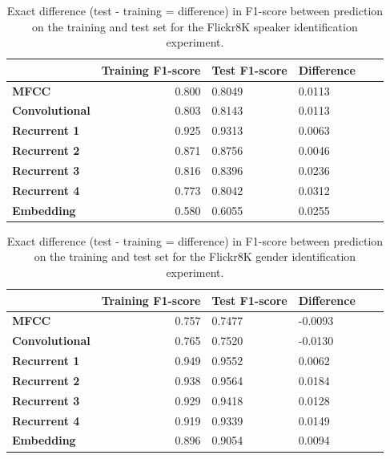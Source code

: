 \documentclass[a4paper, oneside]{book}
\begin{document}
\begin{appendices}
\begin{table}[H]
\begin{center}
\begin{tabular}{|l|r|l|l|l|l|}
\hline              & \bf Training F1-score & \bf Test F1-score & \bf Difference  \\ \hline
\bf MFCC            & 0.800                 & 0.8049            & 0.0113 \\
\bf Convolutional   & 0.803                 & 0.8143            & 0.0113 \\ 
\bf Recurrent 1     & 0.925                 & 0.9313            & 0.0063 \\
\bf Recurrent 2     & 0.871                 & 0.8756            & 0.0046 \\
\bf Recurrent 3     & 0.816                 & 0.8396            & 0.0236 \\
\bf Recurrent 4     & 0.773                 & 0.8042            & 0.0312 \\
\bf Embedding       & 0.580                 & 0.6055            & 0.0255 \\
\hline
\end{tabular}
\end{center}
\caption{\label{table:exact-difference-flickr8k-speaker} Exact difference (test - training = difference) in F1-score between prediction on the training and test set for the Flickr8K speaker identification experiment.  }
\end{table}

\begin{table}[H]
\begin{center}
\begin{tabular}{|l|r|l|l|l|l|}
\hline              & \bf Training F1-score & \bf Test F1-score & \bf Difference  \\ \hline
\bf MFCC            & 0.757                 & 0.7477            & -0.0093 \\
\bf Convolutional   & 0.765                 & 0.7520            & -0.0130 \\ 
\bf Recurrent 1     & 0.949                 & 0.9552            & 0.0062 \\
\bf Recurrent 2     & 0.938                 & 0.9564            & 0.0184 \\
\bf Recurrent 3     & 0.929                 & 0.9418            & 0.0128 \\
\bf Recurrent 4     & 0.919                 & 0.9339            & 0.0149 \\
\bf Embedding       & 0.896                 & 0.9054            & 0.0094 \\
\hline
\end{tabular}
\end{center}
\caption{\label{table:exact-difference-flickr8k-gender} Exact difference (test - training = difference) in F1-score between prediction on the training and test set for the Flickr8K gender identification experiment.  }
\end{table}


\end{appendices}
\end{document}
